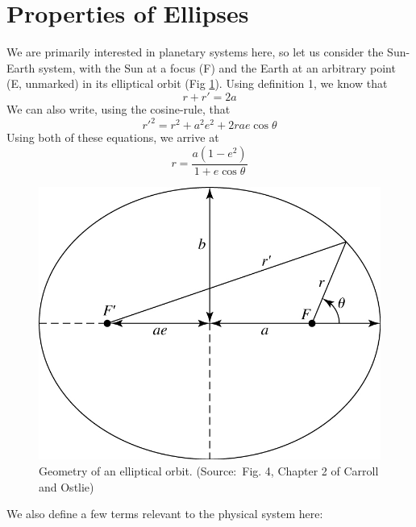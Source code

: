 \documentclass[12pt]{article}
\begin{document}
	\section{Properties of Ellipses}
	We are primarily interested in planetary systems here, so let us consider the Sun-Earth system, with the Sun at a focus (F) and the Earth at an arbitrary point (E, unmarked) in its elliptical orbit (Fig \ref{carroll}). Using definition 1, we know that 
	\begin{equation}
		r + r' = 2a
	\end{equation}
	We can also write, using the cosine-rule, that 
	\begin{equation}
		r'^2 = r^2 + a^2e^2 + 2rae \cos \theta
	\end{equation}
	Using both of these equations, we arrive at
	\begin{equation}
		r = \frac{a(1-e^2)}{1 + e\cos \theta}
		\label{conic}
	\end{equation}
	\begin{figure}[!b]
		\centering
		\includegraphics{planetarysystem.jpg}
		\caption{Geometry of an elliptical orbit. (Source:~Fig. 4, Chapter 2 of Carroll and Ostlie)}
		\label{carroll}
	\end{figure}
	\newpage
	We also define a few terms relevant to the physical system here:
\end{document}
